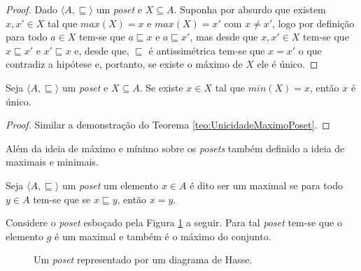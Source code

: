 \begin{proof}
	Dado $\langle A, \sqsubseteq \rangle$ um \textit{poset} e $X \subseteq A$. Suponha por absurdo que existem $x, x' \in X$ tal que $max(X) = x$ e $max(X) = x'$ com $x \neq x'$, logo por definição para todo $a \in X$ tem-se que $a \sqsubseteq x$ e $a \sqsubseteq x'$, mas desde que $x, x '\in X$ tem-se que $x \sqsubseteq x'$ e $x' \sqsubseteq x$ e, desde que, $\sqsubseteq$ é antissimétrica tem-se que $x = x'$ o que contradiz a hipótese e, portanto, se existe o máximo de $X$ ele é único.
\end{proof}

\begin{theorem}\label{teo:UnicidadeMinimoPoset}
	Seja $\langle A, \sqsubseteq \rangle$ um \textit{poset} e $X \subseteq A$. Se existe $x \in X$ tal que $min(X) = x$, então $x$ é único.
\end{theorem}

\begin{proof}
	Similar a demonstração do Teorema \ref{teo:UnicidadeMaximoPoset}.
\end{proof}

Além da ideia de máximo e mínimo sobre os \textit{posets} também definido a ideia de maximais e minimais.

\begin{definition}\label{def:MaximaisPoset}
	Seja $\langle A, \sqsubseteq \rangle$ um \textit{poset}  um elemento $x \in A$ é dito ser um maximal se para todo $y \in A$ tem-se que se $x \sqsubseteq y$, então $x = y$.
\end{definition}

\begin{example}
	Considere o \textit{poset} esboçado pela Figura \ref{fig:DiagramaHasse7} a seguir. Para tal \textit{poset} tem-se que o elemento $g$ é um maximal e também é o máximo do conjunto.
	
	
	\begin{figure}[h]
		\centering
		\caption{Um \textit{poset} representado por um diagrama de Hasse.}
		\label{fig:DiagramaHasse7}
	\end{figure}
\end{example}

